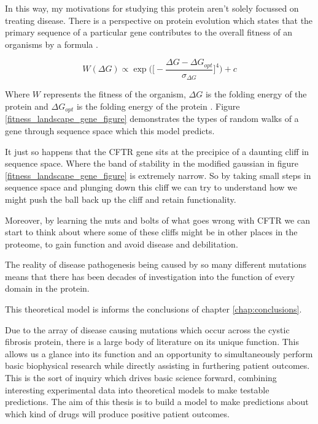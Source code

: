 In this way, my motivations for studying this protein aren't solely focussed on treating disease. There is a perspective on protein evolution which states that the primary sequence of a particular gene contributes to the overall fitness of an organisms by a formula \cite{depristo2005a}.

\begin{equation}
	W(\Delta G) \propto \exp\bigg(\bigg[-\frac{\Delta G - \Delta G_{opt}}{\sigma_{\Delta G}}\bigg]^4\bigg) + c
\end{equation}

Where $W$ represents the fitness of the organism, $\Delta G$ is the folding energy of the protein and $\Delta G_{opt}$ is the folding energy of the protein . Figure \ref{fitness_landscape_gene_figure} demonstrates the types of random walks of a gene through sequence space which this model predicts. 

It just so happens that the CFTR gene sits at the precipice of a daunting cliff in sequence space. Where the band of stability in the modified gaussian in figure \ref{fitness_landscape_gene_figure} is extremely narrow. So by taking small steps in sequence space and plunging down this cliff we can try to understand how we might push the ball back up the cliff and retain functionality.

Moreover, by learning the nuts and bolts of what goes wrong with CFTR we can start to think about where some of these cliffs might be in other places in the proteome, to gain function and avoid disease and debilitation.

The reality of disease pathogenesis being caused by so many different mutations means that there has been decades of investigation into the function of every domain in the protein. 

This theoretical model is informs the conclusions of chapter \ref{chap:conclusions}.

Due to the array of disease causing mutations which occur across the cystic fibrosis protein, there is a large body of literature on its unique function. This allows us a glance into its function and an opportunity to simultaneously perform basic biophysical research while directly assisting in furthering patient outcomes. This is the sort of inquiry which drives basic science forward, combining interesting experimental data into theoretical models to make testable predictions. The aim of this thesis is to build a model to make predictions about which kind of drugs will produce positive patient outcomes.

